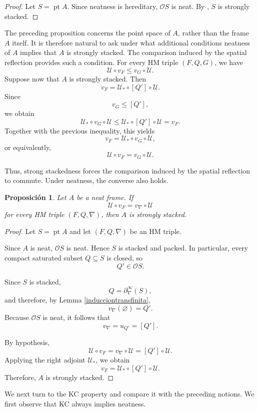 \documentclass[11pt]{amsart}
\DeclareMathOperator{\pt}{pt}
\theoremstyle{plain}
\newtheorem{prop}[thm]{Proposición}
\theoremstyle{definition}
\begin{document}
\begin{proof}
Let \(S=\pt A\). Since neatness is hereditary, \(\mathcal{O}S\) is
neat. By \cite[Theorem 6.2 (a)]{sexton2006ordinal}, \(S\) is strongly
stacked.
\end{proof}

The preceding proposition concerns the point space of \(A\), rather
than the frame \(A\) itself. It is therefore natural to ask under what
additional conditions neatness of \(A\) implies that \(A\) is strongly
stacked. The comparison induced by the spatial reflection provides
such a condition. For every HM triple $(F,Q,G)$, we have
\[
\mathcal{U}\circ v_F\leq v_G\circ\mathcal{U}.
\]
Suppose now that $A$ is strongly stacked. Then
\[
v_F=\mathcal{U}_*\circ[Q']\circ\mathcal{U}.
\]
Since
\[
v_G\leq[Q'],
\]
we obtain
\[
\mathcal{U}_*\circ v_G\circ\mathcal{U}
\leq
\mathcal{U}_*\circ[Q']\circ\mathcal{U}
=v_F.
\]
Together with the previous inequality, this yields
\[
v_F=\mathcal{U}_*\circ v_G\circ\mathcal{U},
\]
or equivalently,
\[
\mathcal{U}\circ v_F
=
v_G\circ\mathcal{U}.
\]

Thus, strong stackedness forces the comparison induced by the spatial
reflection to commute. Under neatness, the converse also holds.
\begin{prop}\label{EficienteFapilado}
Let $A$ be a neat frame. If
\[
\mathcal{U}\circ v_F
=
v_\nabla\circ\mathcal{U}
\]
for every HM triple $(F,Q,\nabla)$, then $A$ is strongly stacked.
\end{prop}

\begin{proof}
Let $S=\pt A$ and let $(F,Q,\nabla)$ be an HM triple.

Since $A$ is neat, $\mathcal{O}S$ is neat. Hence $S$ is stacked and packed.
In particular, every compact saturated subset $Q\subseteq S$ is closed, so
\[
Q'\in\mathcal{O}S.
\]

Since $S$ is stacked,
\[
Q=\partial_\nabla^\infty(S),
\]
and therefore, by Lemma \ref{inducciontransfinita},
\[
v_\nabla(\varnothing)=Q'.
\]
Because $\mathcal{O}S$ is neat, it follows that
\[
v_\nabla=u_{Q'}=[Q'].
\]

By hypothesis,
\[
\mathcal{U}\circ v_F
=
v_\nabla\circ\mathcal{U}
=
[Q']\circ\mathcal{U}.
\]
Applying the right adjoint $\mathcal{U}_*$, we obtain
\[
v_F
=
\mathcal{U}_*\circ[Q']\circ\mathcal{U}.
\]
Therefore, $A$ is strongly stacked.
\end{proof}

We next turn to the KC property and compare it with the preceding
notions. We first observe that KC always implies neatness.
\end{document}
